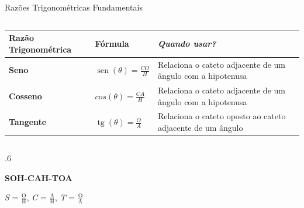 \documentclass[aspectratio=169, t, 8pt]{beamer}
\DeclareMathOperator{\sen}{sen}
\DeclareMathOperator{\tg}{tg}
\begin{document}
    \begin{frame} {Razões Trigonométricas Fundamentais}
        \vspace{1em}
        \begin{columns}[totalwidth=.6\textwidth]
            \begin{tabular}{m{} | m{} | m{}}
                
                \textbf{Razão Trigonométrica} & \textbf{Fórmula} & \textbf{\textit{Quando usar?}}\\[1.2em]
                \hline
                \textbf{Seno} & $\sen{\left( \theta \right)} = \frac{CO}{H}$ & Relaciona o cateto adjacente de um ângulo com a hipotenusa\\[1.4em]
                \hline
                \textbf{Cosseno} & $cos{\left( \theta \right)} = \frac{CA}{H}$ & Relaciona o cateto adjacente de um ângulo com a hipotenusa\\[1.4em]
                \hline
                \textbf{Tangente} & $ \tg{\left( \theta \right)} = \frac{O}{A} $ & Relaciona o cateto oposto ao cateto adjacente de um ângulo\\[1.4em]
                \hline
            \end{tabular}
        \end{columns}

        \begin{columns}[c]
            \begin{column}{.6\textwidth}
                \begin{cardPrincipal}[title=Dica para Memorizar]
                \centering
                \textbf{\large{SOH-CAH-TOA}}

                \vspace{1em}
                
                \large{\textit{S} = $\displaystyle \frac {\text{O}} {\text{H}}$, \textit{C} = $\displaystyle \frac {\text{A}} {\text{H}}$, \textit{T} = $\displaystyle \frac {\text{O}} {\text{A}}$}
            \end{cardPrincipal}
            \end{column}
        \end{columns}
    \end{frame}
\end{document}
